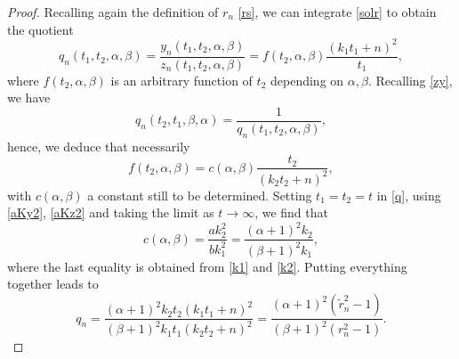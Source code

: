 \documentclass[10pt,a4paper]{amsart}
\begin{document}
\begin{proof}
Recalling again the definition of $r_n$ \eqref{rs}, we can integrate \eqref{solr} to obtain the quotient
\begin{equation}
q_n(t_1,t_2,\alpha,\beta)=\frac{y_n(t_1,t_2,\alpha,\beta)}{z_n(t_1,t_2,\alpha,\beta)}=f(t_2,\alpha,\beta)\frac{(k_1t_1+n)^2}{t_1},\label{q}
\end{equation}
where $f(t_2,\alpha,\beta)$ is an arbitrary function of $t_2$ depending on $\alpha,\beta$. Recalling \eqref{zy}, we have
\begin{equation*}
q_n(t_2,t_1,\beta,\alpha)=\frac{1}{q_n(t_1,t_2,\alpha,\beta)},
\end{equation*}
hence, we deduce that necessarily
\begin{equation*}
f(t_2,\alpha,\beta)=c(\alpha,\beta) \frac{t_2}{(k_2t_2+n)^2},
\end{equation*}
with $c(\alpha,\beta)$ a constant still to be determined. Setting $t_1=t_2=t$ in \eqref{q}, using \eqref{aKy2}, \eqref{aKz2} and taking the limit as $t\to\infty$, we find that
\begin{equation*}
c(\alpha,\beta)=\frac{ak_2^2}{bk_1^2}=\frac{(\alpha+1)^2k_2}{(\beta+1)^2k_1},
\end{equation*}
where the last equality is obtained from \eqref{k1} and \eqref{k2}. Putting everything together leads to
\begin{equation} 
q_n=\frac{(\alpha+1)^2k_2t_2(k_1t_1+n)^2}{(\beta+1)^2k_1t_1(k_2t_2+n)^2}=\frac{(\alpha+1)^2(\tilde{r}_n^2-1)}{(\beta+1)^2(r_n^2-1)}.\label{solq}
\end{equation} 


\end{proof}
\end{document}
